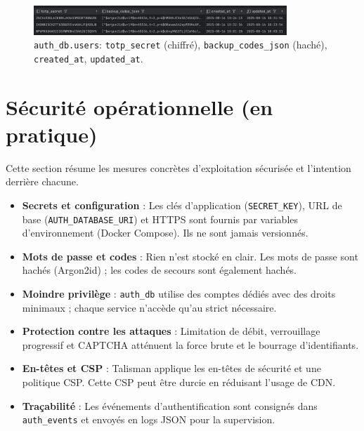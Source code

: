 \begin{figure}[H]
  \centering
  \includegraphics[width=0.85\textwidth]{../figures/chap10/auth_db3.png}
  \caption[users — champs 2FA]{\texttt{auth\_db.users}: \texttt{totp\_secret} (chiffré), \texttt{backup\_codes\_json} (haché), \texttt{created\_at}, \texttt{updated\_at}.}
\end{figure}

\section{Sécurité opérationnelle (en pratique)}
\noindent Cette section résume les mesures concrètes d'exploitation sécurisée et l'intention derrière chacune.

\begin{itemize}
  \item \textbf{Secrets et configuration} : Les clés d'application (\texttt{SECRET\_KEY}), URL de base (\texttt{AUTH\_DATABASE\_URI}) et HTTPS sont fournis par variables d'environnement (Docker Compose). Ils ne sont jamais versionnés.
  \item \textbf{Mots de passe et codes} : Rien n'est stocké en clair. Les mots de passe sont hachés (Argon2id) ; les codes de secours sont également hachés.
  \item \textbf{Moindre privilège} : \texttt{auth\_db} utilise des comptes dédiés avec des droits minimaux ; chaque service n'accède qu'au strict nécessaire.
  \item \textbf{Protection contre les attaques} : Limitation de débit, verrouillage progressif et CAPTCHA atténuent la force brute et le bourrage d'identifiants.
  \item \textbf{En-têtes et CSP} : Talisman applique les en-têtes de sécurité et une politique CSP. Cette CSP peut être durcie en réduisant l'usage de CDN.
  \item \textbf{Traçabilité} : Les événements d'authentification sont consignés dans \texttt{auth\_events} et envoyés en logs JSON pour la supervision.
\end{itemize}




